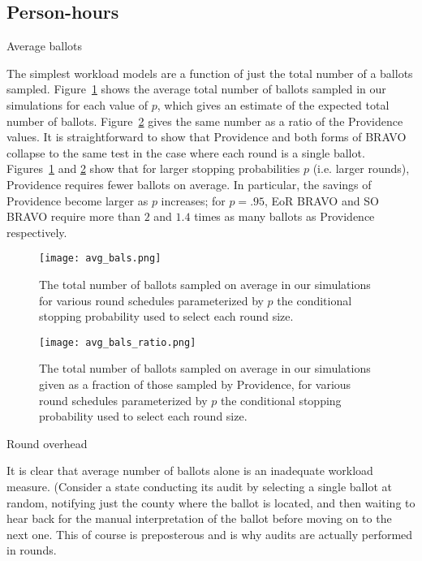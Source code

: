 \subsection{Person-hours}

Average ballots

The simplest workload models are a function of just the total number of a ballots sampled. Figure~\ref{fig:avg_bals} shows the average total number of ballots sampled in our simulations for each value of $p$, which gives an estimate of the expected total number of ballots.
Figure~\ref{fig:avg_bals_ratio} gives the same number as a ratio of the Providence values.
It is straightforward to show that Providence and both forms of BRAVO collapse to the same test in the case where each round is a single ballot. Figures~\ref{fig:avg_bals} and \ref{fig:avg_bals_ratio} show that for larger stopping probabilities $p$ (i.e. larger rounds), Providence requires fewer ballots on average. In particular, the savings of Providence become larger as $p$ increases; for $p=.95$, EoR BRAVO and SO BRAVO require more than $2$ and $1.4$ times as many ballots as Providence respectively. 

\begin{figure}
\texttt{[image: avg\_bals.png]}
\caption{The total number of ballots sampled on average in our simulations for various round schedules parameterized by $p$ the conditional stopping probability used to select each round size.}
\label{fig:avg_bals}
\end{figure}

\begin{figure}
\texttt{[image: avg\_bals\_ratio.png]}
\caption{The total number of ballots sampled on average in our simulations given as a fraction of those sampled by Providence, for various round schedules parameterized by $p$ the conditional stopping probability used to select each round size.}
\label{fig:avg_bals_ratio}
\end{figure}


Round overhead

It is clear that average number of ballots alone is an inadequate workload measure. 
(Consider a state conducting its audit by selecting a single ballot at random, 
notifying just the county where the ballot is located, and then waiting to hear back for the manual interpretation of the ballot before moving on to the next one. 
This of course is preposterous and is why audits are actually performed in rounds.

